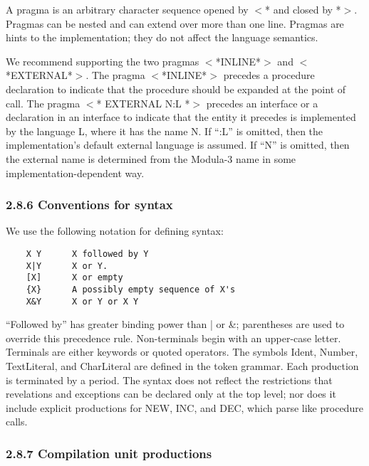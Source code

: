 \documentclass[10pt]{article}
\begin{document}
A pragma is an arbitrary character sequence opened by $<$* and closed by *$>$.
Pragmas can be nested and can extend over more than one line.  Pragmas are
hints to the implementation; they do not affect the language semantics.

We recommend supporting the two pragmas $<$*INLINE*$>$ and $<$*EXTERNAL*$>$.
The pragma $<$*INLINE*$>$ precedes a procedure declaration to indicate that
the procedure should be expanded at the point of call.  The pragma $<$*
EXTERNAL N:L *$>$ precedes an interface or a declaration in an interface to
indicate that the entity it precedes is implemented by the language L, where
it has the name N.  If ``:L'' is omitted, then the implementation's default
external language is assumed.  If ``N'' is omitted, then the external name is
determined from the Modula-3 name in some implementation-dependent way.

\subsubsection*{2.8.6 Conventions for syntax}

We use the following notation for defining syntax:
\begin{verbatim}
    X Y      X followed by Y
    X|Y      X or Y.
    [X]      X or empty
    {X}      A possibly empty sequence of X's
    X&Y      X or Y or X Y
\end{verbatim}
``Followed by'' has greater binding power than | or \&; parentheses are used
to override this precedence rule.  Non-terminals begin with an upper-case
letter.  Terminals are either keywords or quoted operators.  The symbols
Ident, Number, TextLiteral, and CharLiteral are defined in the token grammar.
Each production is terminated by a period.  The syntax does not reflect the
restrictions that revelations and exceptions can be declared only at the top
level; nor does it include explicit productions for NEW, INC, and DEC, which
parse like procedure calls.

\subsubsection*{2.8.7 Compilation unit productions}
\end{document}
